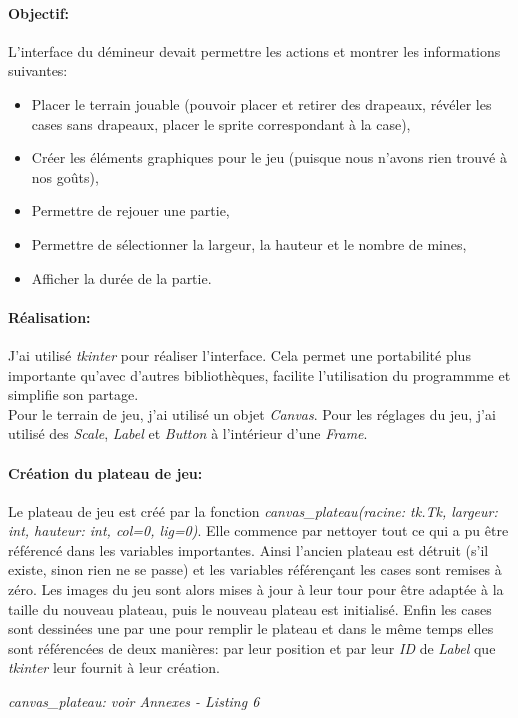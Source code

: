 \documentclass[12pt, a4paper]{article}
\newcommand{\annexe}[1]{
    \begin{flushright}
    \small{\emph{#1}}
    \end{flushright}
}
\begin{document}
\paragraph{Objectif:}
L'interface du démineur devait permettre les actions et montrer les
informations suivantes:

\begin{itemize}
\item Placer le terrain jouable (pouvoir placer et retirer des drapeaux,
révéler les cases sans drapeaux, placer le sprite correspondant à la case),
\item Créer les éléments graphiques pour le jeu (puisque nous n'avons rien
trouvé à nos goûts),
\item Permettre de rejouer une partie,
\item Permettre de sélectionner la largeur, la hauteur et le nombre de mines,
\item Afficher la durée de la partie.
\end{itemize}

\paragraph{Réalisation:}
J'ai utilisé \emph{tkinter} pour réaliser l'interface. Cela permet une
portabilité plus importante qu'avec d'autres bibliothèques, facilite
l'utilisation du programmme et simplifie son partage. \\
Pour le terrain de jeu, j'ai utilisé un objet \emph{Canvas}. Pour les réglages
du jeu, j'ai utilisé des \emph{Scale}, \emph{Label} et \emph{Button} à
l'intérieur d'une \emph{Frame}.

\paragraph{Création du plateau de jeu:}
Le plateau de jeu est créé par la fonction \emph{canvas\_plateau(racine: tk.Tk,
largeur: int, hauteur: int, col=0, lig=0)}. Elle commence par nettoyer tout
ce qui a pu être référencé dans les variables importantes. Ainsi l'ancien
plateau est détruit (s'il existe, sinon rien ne se passe) et les variables
référençant les cases sont remises à zéro. Les images du jeu sont alors mises
à jour à leur tour pour être adaptée à la taille du nouveau plateau, puis le
nouveau plateau est initialisé. Enfin les cases sont dessinées une par une
pour remplir le plateau et dans le même temps elles sont référencées de deux
manières: par leur position et par leur \emph{ID} de \emph{Label} que
\emph{tkinter} leur fournit à leur création.
\annexe{canvas\_plateau: voir Annexes - Listing 6}
\end{document}
